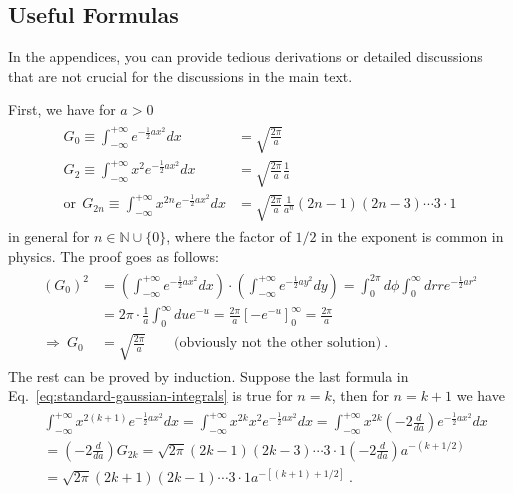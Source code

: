 \documentclass[aps,prd,preprint,floats,epsf,superscriptaddress,nofootinbib]{revtex4}
\begin{document}
\begin{appendix}


\section{Useful Formulas}
\label{sec:useful_formulas}


In the appendices, you can provide tedious derivations or detailed discussions that are not crucial for the discussions in the main text.

First, we have for $a > 0$
\begin{align}
\begin{split}
G_0
\equiv
\int_{-\infty}^{+\infty} e^{- \frac12 ax^2} dx
&= \sqrt{\frac{2\pi}{a}}
\\
G_2
\equiv
\int_{-\infty}^{+\infty} x^2 e^{- \frac12 ax^2} dx
&= \sqrt{\frac{2\pi}{a}} \frac{1}{a}
\\
\mbox{or}~~
G_{2n}
\equiv
\int_{-\infty}^{+\infty} x^{2n} e^{- \frac12 ax^2} dx
&= \sqrt{\frac{2\pi}{a}} \frac{1}{a^n} (2n-1)(2n-3) \cdots 3 \cdot 1
\end{split}
\label{eq:standard-gaussian-integrals}
\end{align}
in general for $n \in {\mathbb N} \cup \{ 0 \}$, where the factor of $1/2$ in the exponent is common in physics.  The proof goes as follows:
\begin{align}
\begin{split}
(G_0)^2 
&= 
\left( \int_{-\infty}^{+\infty} e^{- \frac12 ax^2} dx \right)
\cdot
\left( \int_{-\infty}^{+\infty} e^{- \frac12 ay^2} dy \right)
=
\int_0^{2\pi} d\phi \int_0^{\infty} dr r e^{- \frac12 ar^2}
\\
&=
2\pi \cdot \frac{1}{a} \int_0^{\infty} du e^{-u}
= \frac{2\pi}{a} \left[ - e^{-u} \right]_0^\infty
= \frac{2\pi}{a}
\\
\Rightarrow~
G_0
&=
\sqrt{\frac{2\pi}{a}}
\qquad \mbox{(obviously not the other solution)}
~.
\end{split}
\end{align}
The rest can be proved by induction.  Suppose the last formula in Eq.~\eqref{eq:standard-gaussian-integrals} is true for $n = k$, then for $n = k+1$ we have
\begin{align}
\begin{split}
&
\int_{-\infty}^{+\infty} x^{2(k+1)} e^{- \frac12 ax^2} dx
=
\int_{-\infty}^{+\infty} x^{2k} x^2 e^{- \frac12 ax^2} dx
=
\int_{-\infty}^{+\infty} x^{2k} \left( -2 \frac{d}{da} \right) e^{- \frac12 ax^2} dx
\\
&=
\left( -2 \frac{d}{da} \right) G_{2k}
= \sqrt{2\pi} (2k-1)(2k-3) \cdots 3 \cdot 1 \left( -2 \frac{d}{da} \right) a^{-(k+1/2)}
\\
&= \sqrt{2\pi} (2k+1)(2k-1) \cdots 3 \cdot 1 a^{-[(k+1)+1/2]}
~.
\end{split}
\end{align}



\end{appendix}
\end{document}
